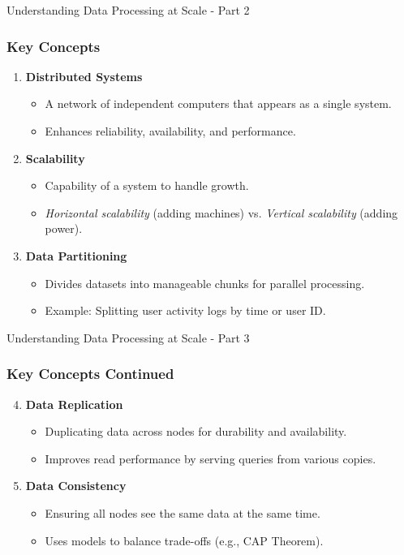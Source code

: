 \documentclass[aspectratio=169]{beamer}
\begin{document}
\begin{frame}[fragile]{Understanding Data Processing at Scale - Part 2}
    \frametitle{Key Concepts}
    \begin{enumerate}
        \item \textbf{Distributed Systems}
            \begin{itemize}
                \item A network of independent computers that appears as a single system.
                \item Enhances reliability, availability, and performance.
            \end{itemize}
        \item \textbf{Scalability}
            \begin{itemize}
                \item Capability of a system to handle growth.
                \item \textit{Horizontal scalability} (adding machines) vs. \textit{Vertical scalability} (adding power).
            \end{itemize}
        \item \textbf{Data Partitioning}
            \begin{itemize}
                \item Divides datasets into manageable chunks for parallel processing.
                \item Example: Splitting user activity logs by time or user ID.
            \end{itemize}
    \end{enumerate}
\end{frame}

\begin{frame}[fragile]{Understanding Data Processing at Scale - Part 3}
    \frametitle{Key Concepts Continued}
    \begin{enumerate}
        \setcounter{enumi}{3} %
        \item \textbf{Data Replication}
            \begin{itemize}
                \item Duplicating data across nodes for durability and availability.
                \item Improves read performance by serving queries from various copies.
            \end{itemize}
        \item \textbf{Data Consistency}
            \begin{itemize}
                \item Ensuring all nodes see the same data at the same time.
                \item Uses models to balance trade-offs (e.g., CAP Theorem).
            \end{itemize}
    \end{enumerate}
\end{frame}
\end{document}
